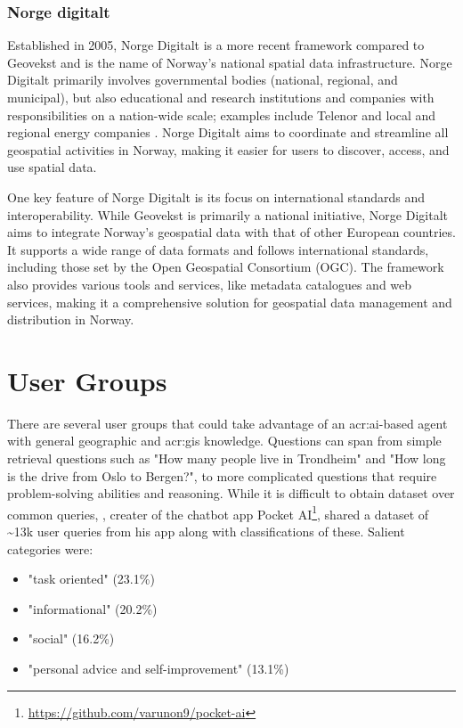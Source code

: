 \subsubsection{Norge digitalt}\label{subsubsec:norge-digitalt}

Established in 2005, Norge Digitalt is a more recent framework compared to Geovekst and is the name of Norway's national spatial data infrastructure. Norge Digitalt primarily involves governmental bodies (national, regional, and municipal), but also educational and research institutions and companies with responsibilities on a nation-wide scale; examples include Telenor and local and regional energy companies \citep[6]{norgedigitaltGenerelleVilkarNorge2023}. Norge Digitalt aims to coordinate and streamline all geospatial activities in Norway, making it easier for users to discover, access, and use spatial data.

One key feature of Norge Digitalt is its focus on international standards and interoperability. While Geovekst is primarily a national initiative, Norge Digitalt aims to integrate Norway's geospatial data with that of other European countries. It supports a wide range of data formats and follows international standards, including those set by the Open Geospatial Consortium (OGC). The framework also provides various tools and services, like metadata catalogues and web services, making it a comprehensive solution for geospatial data management and distribution in Norway.

\section{User Groups}\label{sec:user-groups}

There are several user groups that could take advantage of an \acrshort{acr:ai}-based agent with general geographic and \acrshort{acr:gis} knowledge. Questions can span from simple retrieval questions such as "How many people live in Trondheim" and "How long is the drive from Oslo to Bergen?", to more complicated questions that require problem-solving abilities and reasoning. While it is difficult to obtain dataset over common queries, \cite{kumarWhatArePeople2023a}, creater of the chatbot app Pocket AI\footnote{\url{https://github.com/varunon9/pocket-ai}}, shared a dataset of \textasciitilde 13k user queries from his app along with classifications of these. Salient categories were:

\begin{itemize}
    \item "task oriented" (23.1\%)
    \item "informational" (20.2\%)
    \item "social"  (16.2\%)
    \item "personal advice and self-improvement" (13.1\%)
\end{itemize}

